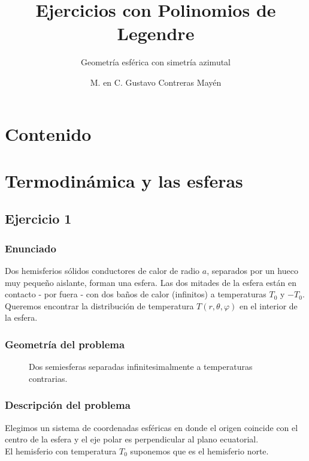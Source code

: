 
\title{\large{Ejercicios con Polinomios de Legendre}}
\subtitle{Geometría esférica con simetría azimutal}
\author{M. en C. Gustavo Contreras Mayén}
\date{}

\maketitle
\fontsize{14}{14}\selectfont
{}
\section*{Contenido}
\section{Termodinámica y las esferas}
\subsection{Ejercicio 1}
\begin{frame}
\frametitle{Enunciado}
Dos hemisferios sólidos conductores de calor de radio $a$, separados por un hueco muy pequeño aislante, forman una esfera. Las dos mitades de la esfera están en contacto - por fuera - con dos baños de calor (infinitos) a temperaturas $T_{0}$ y $-T_{0}$. 
\\
\bigskip
\pause
Queremos encontrar la distribución de temperatura $T (r, \theta, \varphi)$ en el interior de la esfera.
\end{frame}
\begin{frame}
\frametitle{Geometría del problema}
\begin{figure}[H]
\centering

\caption{Dos semiesferas separadas infinitesimalmente a temperaturas contrarias.}
\label{fig:figura2}
\end{figure}
\end{frame}
\begin{frame}
\frametitle{Descripción del problema}
Elegimos un sistema de coordenadas esféricas en donde el origen coincide con el centro de la esfera y el eje polar es perpendicular al plano ecuatorial.
\\
\bigskip
El hemisferio con temperatura $T_{0}$ suponemos que es el hemisferio norte.
\end{frame}
